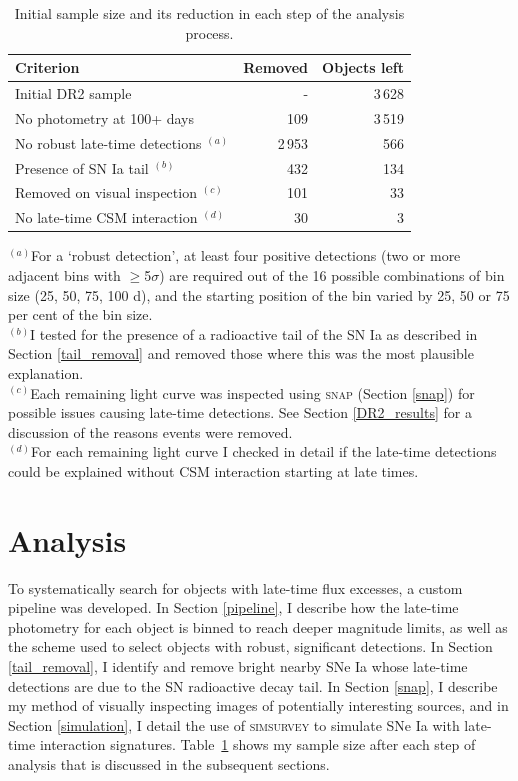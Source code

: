 \documentclass[a4paper,oneside,12pt, class=Latex/Classes/PhDthesisPSnPDF, crop=false]{standalone}
\begin{document}
\begin{table}
 \centering
 \caption{Initial sample size and its reduction in each step of the analysis process.}
 \begin{tabular}{lrr}
  \hline
  Criterion & Removed & Objects left\\
  \hline
  Initial DR2 sample & - & 3\,628\\
  No photometry at 100+ days & 109 & 3\,519\\
   No robust late-time detections $^{(a)}$ & 2\,953 & 566\\
  Presence of SN Ia tail $^{(b)}$ & 432 & 134\\
  Removed on visual inspection $^{(c)}$ & 101 & 33\\
  No late-time CSM interaction $^{(d)}$ & 30 & 3\\
  \hline
 \end{tabular}
 \label{obj_breakdown}
\begin{flushleft}
$^{(a)}$For a `robust detection', at least four positive detections (two or more adjacent bins with $\ge$5$\sigma$) are required out of the 16 possible combinations of bin size (25, 50, 75, 100 d), and the starting position of the bin varied by 25, 50 or 75 per cent of the bin size. \\
$^{(b)}$I tested for the presence of a radioactive tail of the SN Ia as described in Section \ref{tail_removal} and removed those where this was the most plausible explanation. \\
$^{(c)}$Each remaining light curve was inspected using \textsc{snap} (Section \ref{snap}) for possible issues causing late-time detections. See Section \ref{DR2_results} for a discussion of the reasons events were removed.\\
$^{(d)}$For each remaining light curve I checked in detail if the late-time detections could be explained without CSM interaction starting at late times.
\end{flushleft}
\end{table}


\section{Analysis}
\label{DR2_analysis}
To systematically search for objects with late-time flux excesses, a custom pipeline was developed. In Section \ref{pipeline}, I describe how the late-time photometry for each object is binned to reach deeper magnitude limits, as well as the scheme used to select objects with robust, significant detections. In Section \ref{tail_removal}, I identify and remove bright nearby SNe Ia whose late-time detections are due to the SN radioactive decay tail. In Section \ref{snap}, I describe my method of visually inspecting images of potentially interesting sources, and in Section \ref{simulation}, I detail the use of \textsc{simsurvey} to simulate SNe Ia with late-time interaction signatures. Table~\ref{obj_breakdown} shows my sample size after each step of analysis that is discussed in the subsequent sections. 
\end{document}
